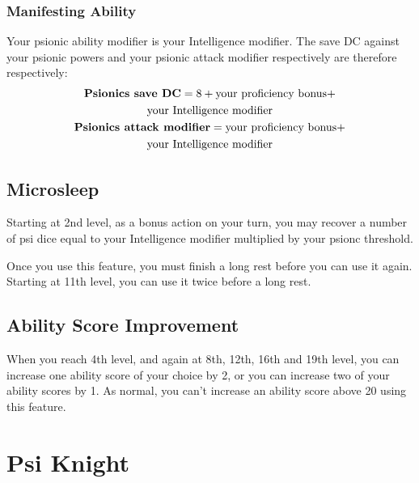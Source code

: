 \subsubsection{Manifesting Ability}
Your psionic ability modifier is your Intelligence modifier.
The save DC against your psionic powers and your
psionic attack modifier respectively are therefore respectively:
\small\begin{equation*}
    \begin{gathered}
        \text{\textbf{Psionics save DC}}
            = 8 + \text{your proficiency bonus} + \\
                  \text{your Intelligence modifier} \\
        \text{\textbf{Psionics attack modifier}}
            = \text{your proficiency bonus} + \\
              \text{your Intelligence modifier}
    \end{gathered}
\end{equation*}\normalsize

\subsection{Microsleep}
Starting at 2nd level,
as a bonus action on your turn,
you may recover a number of psi dice equal to
your Intelligence modifier multiplied by your psionc threshold.

Once you use this feature,
you must finish a long rest before you can use it again.
Starting at 11th level,
you can use it twice before a long rest.

\subsection{Ability Score Improvement}
When you reach 4th level,
and again at 8th, 12th, 16th and 19th level,
you can increase one ability score of your choice by 2,
or you can increase two of your ability scores by 1.
As normal,
you can't increase an ability score above 20 using this feature.

\newpage\section{Psi Knight}

